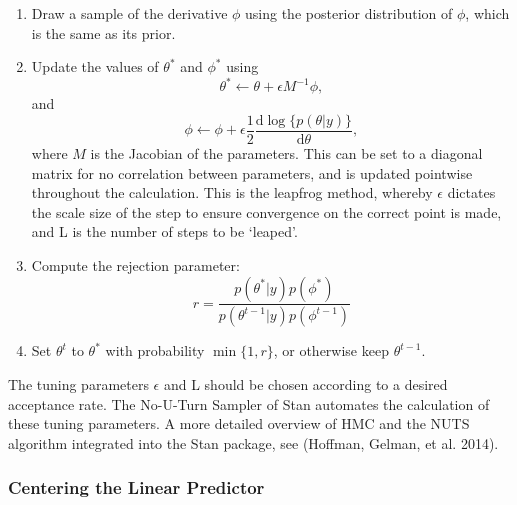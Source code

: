 \documentclass[
]{article}
\begin{document}
\begin{enumerate}
\item Draw a sample of the derivative $\phi$ using the posterior distribution of $\phi$, which is the same as its prior.
\item Update the values of $\theta^*$ and $\phi^*$ using
  \begin{equation}
    \theta^*\leftarrow \theta+\epsilon M^{-1}\phi,
  \end{equation}
  and
  \begin{equation}
    \phi\leftarrow \phi+\epsilon\frac{1}{2}\frac{\mathrm{d}\log\{p(\theta|y)\}}{\mathrm{d}\theta},
  \end{equation}
where $M$ is the Jacobian of the parameters. This can be set to a diagonal matrix for no correlation between parameters, and is updated pointwise throughout the calculation. This is the leapfrog method, whereby $\epsilon$ dictates the scale size of the step to ensure convergence on the correct point is made, and L is the number of steps to be `leaped'.
\item Compute the rejection parameter:
  \begin{equation}
    r=\frac{p(\theta^*|y)p(\phi^*)}{p(\theta^{t-1}|y)p(\phi^{t-1})}
  \end{equation}
\item Set $\theta^t$ to $\theta^*$ with probability $\min\{1,r\}$, or otherwise keep $\theta^{t-1}$.
\end{enumerate}

The tuning parameters \(\epsilon\) and L should be chosen according to a desired acceptance rate. The No-U-Turn Sampler of Stan automates the calculation of these tuning parameters. A more detailed overview of HMC and the NUTS algorithm integrated into the Stan package, see (Hoffman, Gelman, et al. 2014).

\hypertarget{centering-the-linear-predictor}{%
\subsubsection{Centering the Linear Predictor}\label{centering-the-linear-predictor}}
\end{document}
